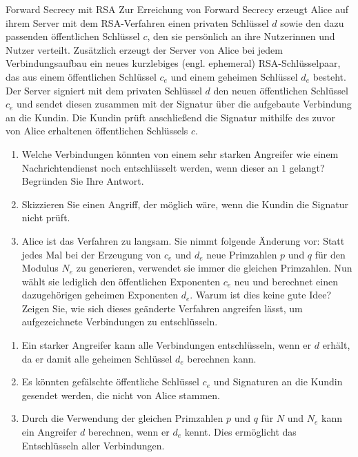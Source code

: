 \documentclass{article}
\begin{document}
\begin{exercise}{Forward Secrecy mit RSA}
  Zur Erreichung von Forward Secrecy erzeugt Alice auf ihrem Server mit dem RSA-Verfahren einen privaten Schlüssel $d$ sowie den dazu passenden öffentlichen Schlüssel $c$, den sie persönlich an ihre Nutzerinnen und Nutzer verteilt. Zusätzlich erzeugt der Server von Alice bei jedem Verbindungsaufbau ein neues kurzlebiges (engl. ephemeral) RSA-Schlüsselpaar, das aus einem öffentlichen Schlüssel $ c_e $ und einem geheimen Schlüssel $ d_e $ besteht. Der Server signiert mit dem privaten Schlüssel $ d $ den neuen öffentlichen Schlüssel $ c_e $ und sendet diesen zusammen mit der Signatur über die aufgebaute Verbindung an die Kundin. Die Kundin prüft anschließend die Signatur mithilfe des zuvor von Alice erhaltenen öffentlichen Schlüssels $ c $.
  \begin{enumerate}
    \item Welche Verbindungen könnten von einem sehr starken Angreifer wie einem Nachrichtendienst noch entschlüsselt werden, wenn dieser an $1$ gelangt? Begründen Sie Ihre Antwort.
    \item Skizzieren Sie einen Angriff, der möglich wäre, wenn die Kundin die Signatur nicht prüft.
    \item Alice ist das Verfahren zu langsam. Sie nimmt folgende Änderung vor: Statt jedes Mal bei der Erzeugung von $c_e$ und $d_e$ neue Primzahlen $p$ und $q$ für den Modulus $N_e$ zu generieren, verwendet sie immer die gleichen Primzahlen. Nun wählt sie lediglich den öffentlichen Exponenten $ c_e $ neu und berechnet einen dazugehörigen geheimen Exponenten $ d_e $. Warum ist dies keine gute Idee? Zeigen Sie, wie sich dieses geänderte Verfahren angreifen lässt, um aufgezeichnete Verbindungen zu entschlüsseln.
  \end{enumerate}

  \begin{solution}
    \begin{enumerate}
      \item Ein starker Angreifer kann alle Verbindungen entschlüsseln, wenn er $d$ erhält, da er damit alle geheimen Schlüssel $d_e$ berechnen kann.
      \item Es könnten gefälschte öffentliche Schlüssel $c_e$ und Signaturen an die Kundin gesendet werden, die nicht von Alice stammen.
      \item Durch die Verwendung der gleichen Primzahlen $p$ und $q$ für $N$ und $N_e$ kann ein Angreifer $d$ berechnen, wenn er $d_e$ kennt. Dies ermöglicht das Entschlüsseln aller Verbindungen.
    \end{enumerate}
  \end{solution}
\end{exercise}
\end{document}
